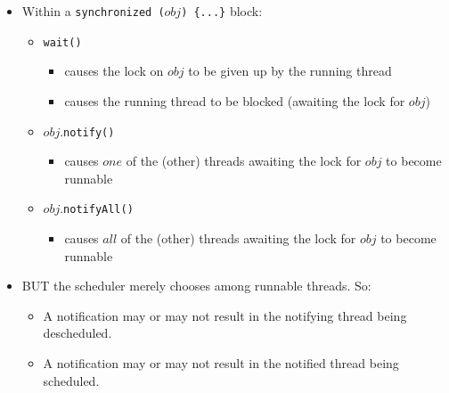 \documentclass{concdistfoils}
\begin{document}
\begin{slide}
\begin{itemize}
\begin{note}
\end{note}
\end{itemize}
\end{slide}

\begin{slide}
\begin{itemize}
\item Within a \texttt{synchronized ($obj$) \{...\}} block:
\begin{itemize}
\item \verb/wait()/ 
\begin{itemize}
\item causes the lock on $obj$ to be given up by the running thread
\item causes the running thread to be blocked (awaiting the lock for $obj$)
\end{itemize}
\vfill
\item $obj$.\verb/notify()/ 
\begin{itemize}
\item causes $one$ of the (other) threads awaiting the lock for $obj$ to become runnable
\end{itemize}
\vfill
\item $obj$.\verb/notifyAll()/ 
\begin{itemize}
\item causes $all$ of the (other) threads awaiting the lock for $obj$ to become runnable
\end{itemize}
\end{itemize}
\vfill
\item BUT the scheduler merely chooses among runnable threads. So:
\begin{itemize}
\item A notification may or may not result in the notifying thread being descheduled.
\item A notification may or may not result in the notified thread being scheduled.
\end{itemize}
\end{itemize}
\end{slide}
\end{document}
